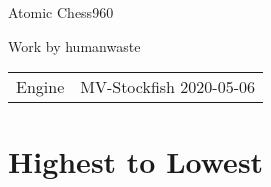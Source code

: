 \documentclass{report}
\begin{document}
\begin{titlepage}
\centering


\Large Atomic Chess960


\normalsize Work by humanwaste


\begin{tabular}{ll}
Engine & MV-Stockfish 2020-05-06 \\[2ex]
\end{tabular}

\end{titlepage}

\restoregeometry
\cleardoublepage

\contentsmargin{0pt}%
\tableofcontents


\chapter{Highest to Lowest}
\end{document}
